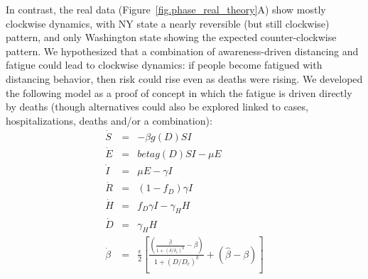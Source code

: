 In contrast, the real data (Figure~\ref{fig.phase_real_theory}A) show mostly clockwise dynamics, with NY state a nearly reversible (but still clockwise) pattern, and only Washington state showing the expected counter-clockwise pattern.
We hypothesized that
a combination of awareness-driven distancing and fatigue
could lead to clockwise dynamics: if people become fatigued with distancing behavior, then risk could rise even as deaths were rising.
We developed the following model as a proof of concept in which
the fatigue is driven directly by deaths (though alternatives
could also be explored linked to cases, hospitalizations, deaths 
and/or a combination):
\begin{eqnarray}
\dot{S} &=& -\beta g(D) SI\\
\dot{E} &=& beta g(D) SI-\mu E\\
\dot{I} &=& \mu E-\gamma I \\
\dot{R} &=& (1-f_D)\gamma I\\
\dot{H} &=& f_D\gamma I - \gamma_H H\\
\dot{D} &=& \gamma_H H \\
\dot{\beta} &=&\frac{\epsilon}{2}\left[\frac{\left(\frac{\hat{\beta}}{1+\left(\delta/\delta_c\right)^{k}}-\beta\right)}{1+\left(D/D_c\right)^k}+\left(\hat{\beta}-\beta\right)\right] \label{eq.fatigue}
\end{eqnarray}



